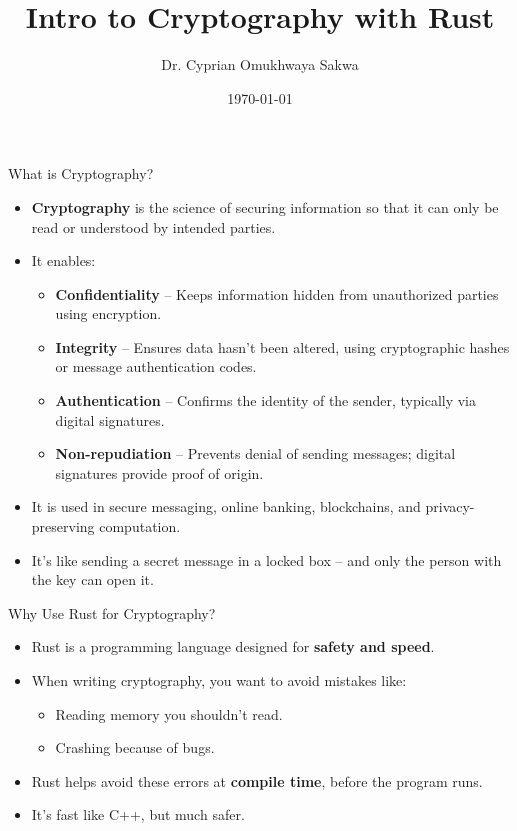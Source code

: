 \documentclass{beamer}
\title{Intro to Cryptography with Rust}
\author{Dr. Cyprian Omukhwaya Sakwa}
\date{\today}
\begin{document}
	
	\begin{frame}[t]
		\titlepage
	\end{frame}
	
	\begin{frame}[t]{What is Cryptography?}
		\begin{itemize}
			\item \textbf{Cryptography} is the science of securing information so that it can only be read or understood by intended parties.
			\item It enables:
			\begin{itemize}
				\item \textbf{Confidentiality} – Keeps information hidden from unauthorized parties using encryption.
				\item \textbf{Integrity} – Ensures data hasn't been altered, using cryptographic hashes or message authentication codes.
				\item \textbf{Authentication} – Confirms the identity of the sender, typically via digital signatures.
				\item \textbf{Non-repudiation} – Prevents denial of sending messages; digital signatures provide proof of origin.
			\end{itemize}
			\item It is used in secure messaging, online banking, blockchains, and privacy-preserving computation.
				\item It’s like sending a secret message in a locked box – and only the person with the key can open it.
		\end{itemize}
	\end{frame}
	
	\begin{frame}[t]{Why Use Rust for Cryptography?}
		\begin{itemize}
			\item Rust is a programming language designed for \textbf{safety and speed}.
			\item When writing cryptography, you want to avoid mistakes like:
			\begin{itemize}
				\item Reading memory you shouldn't read.
				\item Crashing because of bugs.
			\end{itemize}
			\item Rust helps avoid these errors at \textbf{compile time}, before the program runs.
			\item It’s fast like C++, but much safer.
		\end{itemize}
	\end{frame}
	
\end{document}
